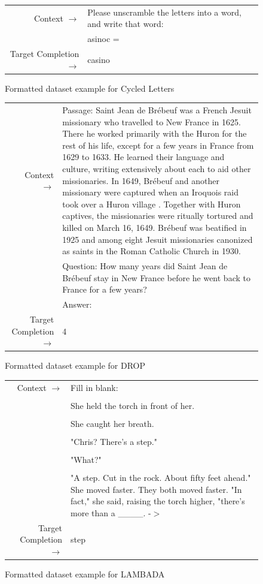 \documentclass{article}
\begin{document}
\begin{figure} { \tt \footnotesize \begin{tabularx}{\linewidth}{r X} \toprule Context $\to$ & Please unscramble the letters into a word, and write that word: \\
& asinoc = \\ 
 \midrule Target Completion $\to$ & casino\\ \bottomrule \end{tabularx} }  \caption{Formatted dataset example for Cycled Letters}
 \label{eval:CL}  
 \end{figure}
\begin{figure} { \tt \footnotesize \begin{tabularx}{\linewidth}{r X} \toprule Context $\to$ & Passage: Saint Jean de Br\'ebeuf  was a French Jesuit missionary who travelled to New France  in 1625. There he worked primarily with the Huron for the rest of his life, except for a few years in France from 1629 to 1633. He learned their language and culture, writing extensively about each to aid other missionaries. In 1649, Br\'ebeuf and another missionary were captured when an Iroquois raid took over a Huron village . Together with Huron captives, the missionaries were ritually tortured and killed on March 16, 1649. Br\'ebeuf was beatified in 1925 and among eight Jesuit missionaries canonized as saints in the Roman Catholic Church in 1930. \\ 
 & Question: How many years did Saint Jean de Br\'ebeuf stay in New France before he went back to France for a few years? \\ 
 & Answer: \\ 
 \midrule Target Completion $\to$ & 4 \\
\bottomrule \end{tabularx} }  \caption{Formatted dataset example for DROP}  \label{eval:DROP}  \end{figure}
\begin{figure} { \tt \footnotesize \begin{tabularx}{\linewidth}{r X} \toprule Context $\to$ & Fill in blank: \\ 
 &  \\ 
 & She held the torch in front of her. \\ 
 &  \\ 
 & She caught her breath. \\ 
 &  \\ 
 & "Chris? There's a step." \\ 
 &  \\ 
 & "What?" \\ 
 &  \\ 
 & "A step. Cut in the rock. About fifty feet ahead." She moved faster. They both moved faster. "In fact," she said, raising the torch higher, "there's more than a \_\_\_\_. -\ensuremath{>} \\ 
 \midrule Target Completion $\to$ & step\\ \bottomrule \end{tabularx} }  \caption{Formatted dataset example for LAMBADA}  \label{eval:LAMBADA}  \end{figure}
\end{document}
